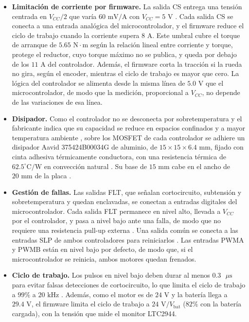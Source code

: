 \documentclass[../../General.tex]{subfiles}
\begin{document}
\begin{itemize}
    \item \textbf{Limitación de corriente por firmware.} La salida CS entrega una tensión centrada en $V_{CC}/2$ que varía $60\text{ mV/A}$ con $V_{CC} = 5\text{ V}$ \citep{pololu_h2_36v11}. Cada salida CS se conecta a una entrada analógica del microcontrolador, y el firmware reduce el ciclo de trabajo cuando la corriente supera $8\text{ A}$. Este umbral cubre el torque de arranque de $5.65\text{ N}\cdot\text{m}$ según la relación lineal entre corriente y torque, protege el reductor, cuyo torque máximo no se publica, y queda por debajo de los $11\text{ A}$ del controlador. Además, el firmware corta la tracción si la rueda no gira, según el encoder, mientras el ciclo de trabajo es mayor que cero. La lógica del controlador se alimenta desde la misma línea de $5.0\text{ V}$ que el microcontrolador, de modo que la medición, proporcional a $V_{CC}$, no depende de las variaciones de esa línea.
    \item \textbf{Disipador.} Como el controlador no se desconecta por sobretemperatura y el fabricante indica que su capacidad se reduce en espacios confinados y a mayor temperatura ambiente \citep{pololu_h2_36v11}, sobre los MOSFET de cada controlador se adhiere un disipador Aavid 375424B00034G de aluminio, de $15 \times 15 \times 6.4\text{ mm}$, fijado con cinta adhesiva térmicamente conductora, con una resistencia térmica de $62.5^\circ\text{C/W}$ en convección natural \citep{aavid_heatsinks}. Su base de $15\text{ mm}$ cabe en el ancho de $20\text{ mm}$ de la placa \citep{pololu_h2_36v11}.
    \item \textbf{Gestión de fallas.} Las salidas FLT, que señalan cortocircuito, subtensión y sobretemperatura y quedan enclavadas, se conectan a entradas digitales del microcontrolador. Cada salida FLT permanece en nivel alto, llevada a $V_{CC}$ por el controlador, y pasa a nivel bajo ante una falla, de modo que no requiere una resistencia pull-up externa \citep{pololu_h2_36v11}. Una salida común se conecta a las entradas SLP de ambos controladores para reiniciarlos \citep{pololu_h2_36v11}. Las entradas PWMA y PWMB están en nivel bajo por defecto, de modo que, si el microcontrolador se reinicia, ambos motores quedan frenados.
    \item \textbf{Ciclo de trabajo.} Los pulsos en nivel bajo deben durar al menos $0.3\text{ }\mu\text{s}$ para evitar falsas detecciones de cortocircuito, lo que limita el ciclo de trabajo a $99\%$ a $20\text{ kHz}$ \citep{pololu_h2_36v11}. Además, como el motor es de $24\text{ V}$ y la batería llega a $29.4\text{ V}$, el firmware limita el ciclo de trabajo a $24\text{ V}/V_{\text{bat}}$ ($82\%$ con la batería cargada), con la tensión que mide el monitor LTC2944.

\end{itemize}
\end{document}
